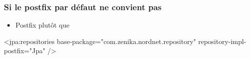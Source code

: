 \begin{frame}[fragile]
 \frametitle{Si le postfix par défaut ne convient pas}
 \begin{itemize}
  \item Postfix  plutôt que 
 \end{itemize}
 \begin{xmlcode}
<jpa:repositories base-package="com.zenika.nordnet.repository" 
                  repository-impl-postfix="Jpa" /> 
 \end{xmlcode}
\end{frame}

